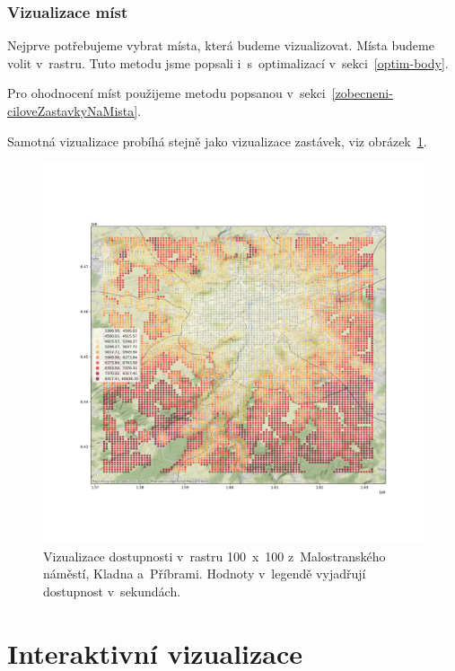 \subsubsection{Vizualizace míst}

Nejprve potřebujeme vybrat místa, která budeme vizualizovat. Místa budeme volit v~rastru. Tuto metodu jsme popsali i~s~optimalizací v~sekci~\ref{optim-body}.

Pro ohodnocení míst použijeme metodu popsanou v~sekci~\ref{zobecneni-ciloveZastavkyNaMista}.

Samotná vizualizace probíhá stejně jako vizualizace zastávek, viz obrázek~\ref{fig:gtfs-mostAccessiblePlace}.

\begin{figure}[ht]
    \centering
    \includegraphics[width=\textwidth]{../img/staticPlaceVisualization.png}
    \caption{Vizualizace dostupnosti v~rastru 100~x~100 z~Malostranského náměstí, Kladna a~Příbrami. Hodnoty v~legendě vyjadřují dostupnost v~sekundách.}
    \label{fig:gtfs-mostAccessiblePlace}
\end{figure}


\section{Interaktivní vizualizace}\label{Interaktivni-vizualizace}

